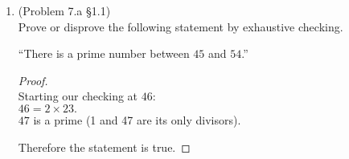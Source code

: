 \documentclass[12pt]{article}
\begin{document}
\begin{enumerate}[1.)]

\vskip 1in

\item (Problem 7.a \S1.1)\\
Prove or disprove the following statement by exhaustive checking.

``There is a prime number between $45$ and $54$.''

\begin{proof}$\ $\\
Starting our checking at $46$:\\
$46=2\times 23.$\\
$47$ is a prime (1 and 47 are its only divisors). 

Therefore the statement is true.

\end{proof}




\end{enumerate}
\end{document}
